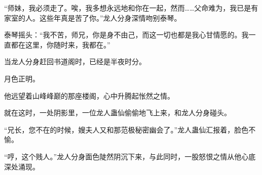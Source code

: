 \begin{this_body}
“师妹，我必须走了。唉，我多想永远地和你在一起，然而……父命难为，我已是有家室的人。这些年真是苦了你。”龙人分身深情吻别泰琴。

泰琴摇头：“我不苦，师兄，你是身不由己，而这一切也都是我心甘情愿的。我一直都在这里，你随时来，我都在。”

当龙人分身赶回书道阁时，已经是半夜时分。

月色正明。

他远望着山峰峰巅的那座楼阁，心中升腾起怅然之情。

就在这时，一处阴影里，一位龙人蛊仙偷偷地飞上来，和龙人分身碰头。

“兄长，您不在的时候，嫂夫人又和那范极秘密幽会了。”龙人蛊仙汇报着，脸色不愉。

“哼，这个贱人。”龙人分身面色陡然阴沉下来，与此同时，一股怒恨之情从他心底深处涌现。

\end{this_body}

